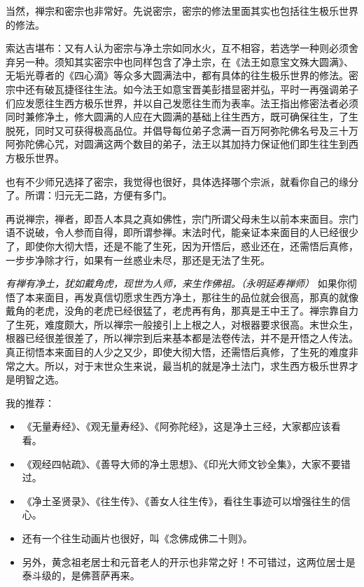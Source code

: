 当然，禅宗和密宗也非常好。先说密宗，密宗的修法里面其实也包括往生极乐世界的修法。

索达吉堪布：又有人认为密宗与净土宗如同水火，互不相容，若选学一种则必须舍弃另一种。须知其实密宗中也同样包含了净土宗，在《法王如意宝文殊大圆满》、无垢光尊者的《四心滴》等众多大圆满法中，都有具体的往生极乐世界的修法。密宗中还有破瓦捷径往生法。如今法王如意宝晋美彭措显密并弘，平时一再强调弟子们应发愿往生西方极乐世界，并以自己发愿往生而为表率。法王指出修密法者必须同时兼修净土，修大圆满的人应在大圆满的基础上往生西方，既可确保往生，了生脱死，同时又可获得极高品位。并倡导每位弟子念满一百万阿弥陀佛名号及三十万阿弥陀佛心咒，对圆满这两个数目的弟子，法王以其加持力保证他们即生往生到西方极乐世界。

也有不少师兄选择了密宗，我觉得也很好，具体选择哪个宗派，就看你自己的缘分了。所谓：归元无二路，方便有多门。

再说禅宗，禅者，即吾人本具之真如佛性，宗门所谓父母未生以前本来面目。宗门语不说破，令人参而自得，即所谓参禅。末法时代，能亲证本来面目的人已经很少了，即使你大彻大悟，还是不能了生死，因为开悟后，惑业还在，还需悟后真修，一步步净除才行，如果有一丝惑业未尽，那还是无法了生死。

\textit{有禅有净土，犹如戴角虎，现世为人师，来生作佛祖。（永明延寿禅师）} 如果你彻悟了本来面目，再发真信切愿求生西方净土，那往生的品位就会很高，那真的就像戴角的老虎，没角的老虎已经很猛了，老虎再有角，那真是王中王了。禅宗靠自力了生死，难度颇大，所以禅宗一般接引上上根之人，对根器要求很高。末世众生，根器已经很差很差了，所以禅宗到后来基本都是法卷传法，并不是开悟之人传法。真正彻悟本来面目的人少之又少，即使大彻大悟，还需悟后真修，了生死的难度非常之大。所以，对于末世众生来说，最当机的就是净土法门，求生西方极乐世界才是明智之选。

我的推荐：

\begin{itemize}
    \item 《无量寿经》、《观无量寿经》、《阿弥陀经》，这是净土三经，大家都应该看看。
    \item 《观经四帖疏》、《善导大师的净土思想》、《印光大师文钞全集》，大家不要错过。
    \item 《净土圣贤录》、《往生传》、《善女人往生传》，看往生事迹可以增强往生的信心。
    \item 还有一个往生动画片也很好，叫《念佛成佛二十则》。
    \item 另外，黄念祖老居士和元音老人的开示也非常之好！不可错过，这两位居士是泰斗级的，是佛菩萨再来。
\end{itemize}


